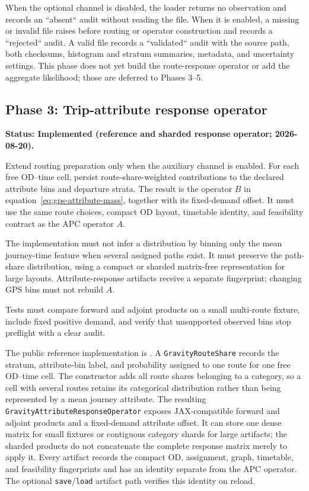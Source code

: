 When the optional channel is disabled, the loader returns no observation and
records an ``absent`` audit without reading the file.  When it is enabled, a
missing or invalid file raises before routing or operator construction and
records a ``rejected`` audit.  A valid file records a ``validated`` audit with
the source path, both checksums, histogram and stratum summaries, metadata, and
uncertainty settings.  This phase does not yet build the route-response
operator or add the aggregate likelihood; those are deferred to Phases 3--5.

\subsection{Phase 3: Trip-attribute response operator}
\label{sec:gps-implementation-phase-3}
\textbf{Status: Implemented (reference and sharded response operator; 2026-08-20).}

Extend routing preparation only when the auxiliary channel is enabled.  For
each free OD--time cell, persist route-share-weighted contributions to the
declared attribute bins and departure strata.  The result is the operator
$B$ in equation~\eqref{eq:gps-attribute-mass}, together with its fixed-demand
offset.  It must use the same route choices, compact OD layout, timetable
identity, and feasibility contract as the APC operator $A$.

The implementation must not infer a distribution by binning only the mean
journey-time feature when several assigned paths exist.  It must preserve the
path-share distribution, using a compact or sharded matrix-free representation
for large layouts.  Attribute-response artifacts receive a separate
fingerprint; changing GPS bins must not rebuild $A$.

Tests must compare forward and adjoint products on a small multi-route fixture,
include fixed positive demand, and verify that unsupported observed bins stop
preflight with a clear audit.

The public reference implementation is
.  A
\texttt{GravityRouteShare} records the stratum, attribute-bin label, and
probability assigned to one route for one free OD--time cell.  The constructor
adds all route shares belonging to a category, so a cell with several routes
retains its categorical distribution rather than being represented by a mean
journey attribute.  The resulting
\texttt{GravityAttributeResponseOperator} exposes JAX-compatible forward and
adjoint products and a fixed-demand attribute offset.  It can store one dense
matrix for small fixtures or contiguous category shards for large artifacts;
the sharded products do not concatenate the complete response matrix merely
to apply it.  Every artifact records the compact OD, assignment, graph,
timetable, and feasibility fingerprints and has an identity separate from
the APC operator.  The optional \texttt{save}/\texttt{load} artifact path
verifies this identity on reload.

